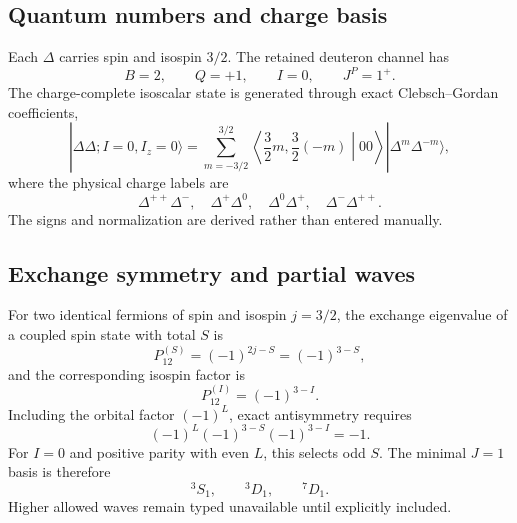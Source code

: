 \documentclass[11pt]{article}
\begin{document}
\subsection{Quantum numbers and charge basis}

Each \(\Delta\) carries spin and isospin \(3/2\).  The retained deuteron channel has
\begin{equation}
 B=2,
 \qquad Q=+1,
 \qquad I=0,
 \qquad J^P=1^+.
\label{eq:dd-quantum-numbers}
\end{equation}
The charge-complete isoscalar state is generated through exact Clebsch--Gordan coefficients,
\begin{equation}
 |\Delta\Delta;I=0,I_z=0\rangle
 =\sum_{m=-3/2}^{3/2}
 \left\langle \frac32 m,\frac32(-m)\middle|00\right\rangle
 |\Delta^{m}\Delta^{-m}\rangle,
\label{eq:dd-isospin}
\end{equation}
where the physical charge labels are
\begin{equation}
 \Delta^{++}\Delta^{-},\quad
 \Delta^{+}\Delta^{0},\quad
 \Delta^{0}\Delta^{+},\quad
 \Delta^{-}\Delta^{++}.
\label{eq:dd-charge-basis}
\end{equation}
The signs and normalization are derived rather than entered manually.

\subsection{Exchange symmetry and partial waves}

For two identical fermions of spin and isospin \(j=3/2\), the exchange eigenvalue of a coupled spin state with total \(S\) is
\begin{equation}
 P_{12}^{(S)}=(-1)^{2j-S}=(-1)^{3-S},
\label{eq:dd-spin-exchange}
\end{equation}
and the corresponding isospin factor is
\begin{equation}
 P_{12}^{(I)}=(-1)^{3-I}.
\label{eq:dd-isospin-exchange}
\end{equation}
Including the orbital factor \((-1)^L\), exact antisymmetry requires
\begin{equation}
 (-1)^L(-1)^{3-S}(-1)^{3-I}=-1.
\label{eq:dd-antisymmetry-condition}
\end{equation}
For \(I=0\) and positive parity with even \(L\), this selects odd \(S\).  The minimal \(J=1\) basis is therefore
\begin{equation}
 {}^3S_1,
 \qquad {}^3D_1,
 \qquad {}^7D_1.
\label{eq:dd-partial-waves}
\end{equation}
Higher allowed waves remain typed unavailable until explicitly included.
\end{document}
